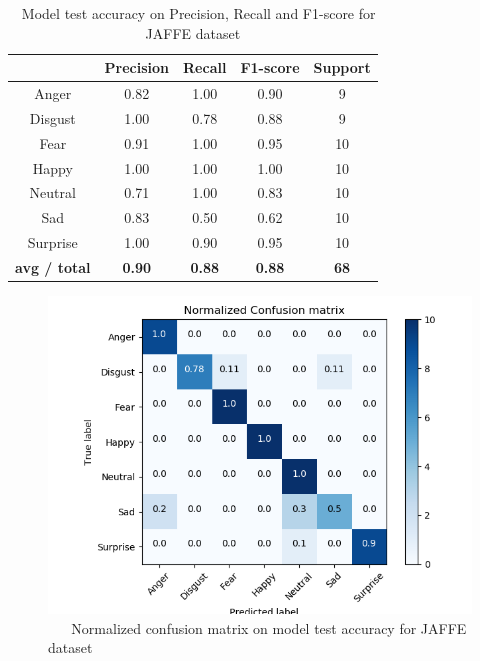 \documentclass[master]{thesis-uestc}
\begin{document}
\begin{table}[ht]
\renewcommand{\arraystretch}{1.3}
\caption{\,\,\,\,\,Model test accuracy on Precision, Recall and F1-score for JAFFE dataset}
\label{table_jaffe_scores}
\begin{center}
\begin{tabular}{|c|c|c|c|c|}

\hline
 & Precision & Recall & F1-score & Support\\ \hline

Anger & 0.82 & 1.00 & 0.90 & 9\\ \hline
Disgust & 1.00 & 0.78 & 0.88 & 9\\ \hline
Fear & 0.91 & 1.00 & 0.95 & 10\\ \hline
Happy & 1.00 & 1.00 & 1.00 & 10\\ \hline
Neutral & 0.71 & 1.00 & 0.83 & 10\\ \hline
Sad & 0.83 & 0.50 & 0.62 & 10\\ \hline
Surprise & 1.00 & 0.90 & 0.95 & 10\\ \hline

\textbf{avg / total} & \textbf{0.90} & \textbf{0.88} & \textbf{0.88} & \textbf{68}\\ \hline
\end{tabular}
\end{center}
\end{table}

\begin{figure}[ht]
\includegraphics[width=5in]{pic/JAFFE_CM_normalized.png}
\caption{\,\,\,\,\,\,\,\,\,\,Normalized confusion matrix on model test accuracy for JAFFE dataset}
\label{fig_jaffe_cm_scores}
\end{figure}
\end{document}
